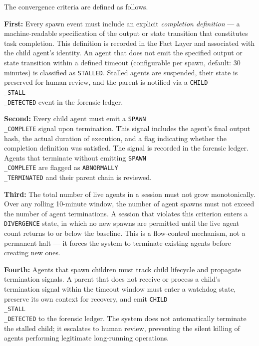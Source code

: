 The convergence criteria are defined as follows.

\textbf{First:} Every spawn event must include an explicit \textit{completion definition} — a machine-readable specification of the output or state transition that constitutes task completion. This definition is recorded in the Fact Layer and associated with the child agent's identity. An agent that does not emit the specified output or state transition within a defined timeout (configurable per spawn, default: 30 minutes) is classified as \texttt{STALLED}. Stalled agents are suspended, their state is preserved for human review, and the parent is notified via a \texttt{CHILD\\_STALL\\_DETECTED} event in the forensic ledger.

\textbf{Second:} Every child agent must emit a \texttt{SPAWN\\_COMPLETE} signal upon termination. This signal includes the agent's final output hash, the actual duration of execution, and a flag indicating whether the completion definition was satisfied. The signal is recorded in the forensic ledger. Agents that terminate without emitting \texttt{SPAWN\\_COMPLETE} are flagged as \texttt{ABNORMALLY\\_TERMINATED} and their parent chain is reviewed.

\textbf{Third:} The total number of live agents in a session must not grow monotonically. Over any rolling 10-minute window, the number of agent spawns must not exceed the number of agent terminations. A session that violates this criterion enters a \texttt{DIVERGENCE} state, in which no new spawns are permitted until the live agent count returns to or below the baseline. This is a flow-control mechanism, not a permanent halt — it forces the system to terminate existing agents before creating new ones.

\textbf{Fourth:} Agents that spawn children must track child lifecycle and propagate termination signals. A parent that does not receive or process a child's termination signal within the timeout window must enter a watchdog state, preserve its own context for recovery, and emit \texttt{CHILD\\_STALL\\_DETECTED} to the forensic ledger. The system does not automatically terminate the stalled child; it escalates to human review, preventing the silent killing of agents performing legitimate long-running operations.

